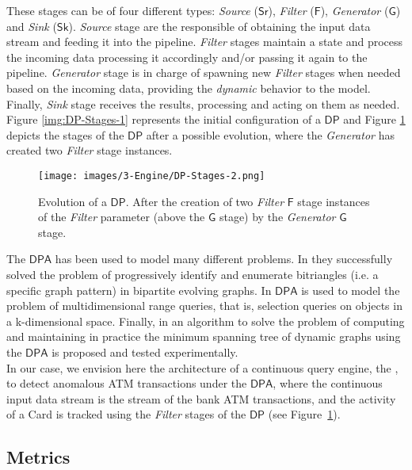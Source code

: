 These stages can be of four different types: \emph{Source} ($\mathsf{Sr}$), \emph{Filter} ($\mathsf{F}$), \emph{Generator} ($\mathsf{G}$) and \emph{Sink} ($\mathsf{Sk}$). \emph{Source} stage are the responsible of obtaining the input data stream and feeding it into the pipeline. \emph{Filter} stages maintain a state and process the incoming data processing it accordingly and/or passing it again to the pipeline. \emph{Generator} stage is in charge of spawning new \emph{Filter} stages when needed based on the incoming data, providing the \textit{dynamic} behavior to the model. Finally, \emph{Sink} stage receives the results, processing and acting on them as needed.
Figure \ref{img:DP-Stages-1} represents the initial configuration of a $\mathsf{DP}$ and Figure \ref{img:DP-Stages-2} depicts the stages of the $\mathsf{DP}$ after a possible evolution, where the \emph{Generator} has created two \emph{Filter} stage instances.\\

\begin{figure}[H]
  \centering
  \texttt{[image: images/3-Engine/DP-Stages-2.png]}
  \caption{Evolution of a $\mathsf{DP}$. After the creation of two \emph{Filter} $\mathsf{F}$ stage instances of the \emph{Filter} parameter (above the $\mathsf{G}$ stage) by the \emph{Generator} $\mathsf{G}$ stage.}
  \label{img:DP-Stages-2}
\end{figure}

The $\mathsf{DPA}$ has been used to model many different problems. In \cite{DP-bitriangles2021} they successfully solved the problem of progressively identify and enumerate bitriangles (i.e. a specific graph pattern) in bipartite evolving graphs. In \cite{DP-Lugosi_Enes_2019} $\mathsf{DPA}$ is used to model the problem of multidimensional range queries, that is, selection queries on objects in a k-dimensional space. Finally, in \cite{DP-Benedi_Garcia_2024} an algorithm to solve the problem of computing and maintaining in practice the minimum spanning tree of dynamic graphs 
using the $\mathsf{DPA}$ is proposed and tested experimentally.\\

In our case, we envision here the architecture of a continuous query engine, the \DPATM, to detect anomalous ATM transactions under the $\mathsf{DPA}$, 
where the continuous input data stream is the stream of the bank ATM transactions, 
and the activity of a Card is tracked using the \emph{Filter} stages of the $\mathsf{DP}$ (see Figure~\ref{img:DP-Stages-2}).
\subsection{Metrics}\label{exps:evaluation-metrics}

